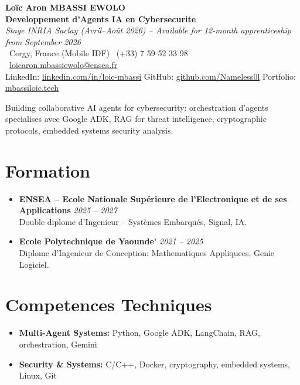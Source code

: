 \documentclass[a4paper,11pt]{article}
\begin{document}
\begin{center}
    {\Large \textbf{Lo\"ic Aron MBASSI EWOLO}} \\ \vspace{4pt}
    \textbf{\large Developpement d'Agents IA en Cybersecurite} \\
    \textit{\small Stage INRIA Saclay (Avril--Ao\^ut 2026) -- Available for 12-month apprenticeship from September 2026} \\ \vspace{4pt}
    \small
    \Pointinghand\ Cergy, France (Mobile IDF) \quad
    \Mobilefone\ (+33) 7 59 52 33 98 \quad
    {\color{primary}\Letter\ \href{mailto:loicaron.mbassiewolo@ensea.fr}{loicaron.mbassiewolo@ensea.fr}} \\ \vspace{2pt}
    {\color{primary}LinkedIn: \href{https://www.linkedin.com/in/loic-mbassi/}{linkedin.com/in/loic-mbassi}} \quad
    {\color{primary}GitHub: \href{https://github.com/Nameless0l}{github.com/Nameless0l}} \quad
    {\color{primary}Portfolio: \href{https://mbassiloic.tech}{mbassiloic.tech}}
\end{center}

\vspace{-6pt}

\noindent\small{Building collaborative AI agents for cybersecurity: orchestration d'agents specialises avec Google ADK, RAG for threat intelligence, cryptographic protocols, embedded systems security analysis.}

\section{Formation}
\begin{itemize}[leftmargin=*, label=\tiny$\bullet$, nosep]
    \item \textbf{ENSEA -- Ecole Nationale Sup\'erieure de l'Electronique et de ses Applications} \hfill \textit{2025 -- 2027} \\
    \small{Double diplome d'Ingenieur -- Syst\`emes Embarqu\'es, Signal, IA.}
    \item \textbf{Ecole Polytechnique de Yaounde\'} \hfill \textit{2021 -- 2025} \\
    \small{Diplome d'Ingenieur de Conception: Mathematiques Appliquees, Genie Logiciel.}
\end{itemize}

\section{Competences Techniques}
\begin{itemize}[leftmargin=*, nosep]
    \item \small{\textbf{Multi-Agent Systems:} Python, Google ADK, LangChain, RAG, orchestration, Gemini}
    \item \small{\textbf{Security \& Systems:} C/C++, Docker, cryptography, embedded systems, Linux, Git}
\end{itemize}
\end{document}
